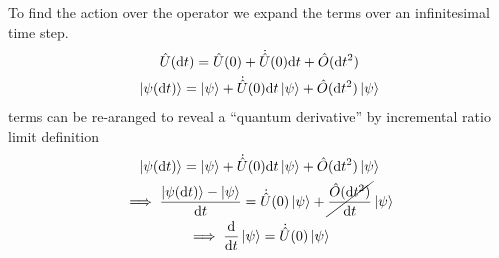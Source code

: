 \begin{multicols}{3}
  To find the action over the operator we expand the terms over an infinitesimal time step.
  \begin{equation*}
    \begin{gathered}
      \hat{U}(\text{d}t) = \hat{U}(0) + \dot{\hat{U}}(0)\text{d}t + \hat{O}(\text{d}t^2) \\
      \ket{\psi(\text{d}t)} = \ket\psi + \dot{\hat{U}}(0)\text{d}t\ket\psi + \hat{O}(\text{d}t^2)\ket\psi
    \end{gathered}
  \end{equation*}
  terms can be re-aranged to reveal a ``quantum derivative'' by incremental ratio limit definition
  \begin{equation*}
    \begin{gathered}
      \ket{\psi(\text{d}t)} = \ket\psi + \dot{\hat{U}}(0)\text{d}t\ket\psi + \hat{O}(\text{d}t^2)\ket\psi \\
      \implies \frac{\ket{\psi(\text{d}t)} - \ket\psi}{\text{d}t} = \dot{\hat{U}}(0)\ket\psi + \cancel{\frac{\hat{O}(\text{d}t^2)}{\text{d}t}}\ket\psi \\
      \implies \dv{t}\ket\psi = \dot{\hat{U}}(0)\ket\psi
    \end{gathered}
  \end{equation*} \\


\end{multicols}
